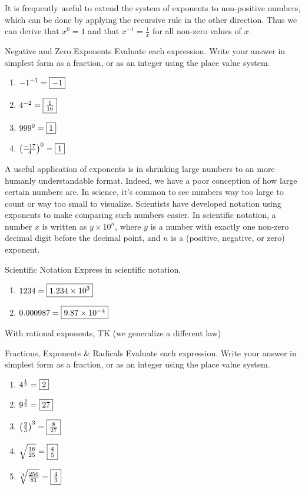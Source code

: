 \documentclass[12pt,a4paper]{report}
\begin{document}
It is frequently useful to extend the system of exponents to non-positive numbers, which can
be done by applying the recursive rule in the other direction. Thus we can derive that \(x^0
= 1\) and that \(x^{-1} = \frac{1}{x}\) for all non-zero values of \(x\).

\begin{problem}{Negative and Zero Exponents}
 Evaluate each expression. Write your answer in simplest form as a fraction, or
 as an integer using the place value system.

 \begin{enumerate}[\hspace{.5cm}a.]
  \item \({-1}^{-1}=\Ans{-1}\)
  \item \(4^{-2}=\Ans{\frac{1}{16}}\)
  \item \({999}^0=\Ans{1}\)
  \item \({\left(\frac{-17}{4}\right)}^0=\Ans{1}\)
 \end{enumerate}
\end{problem}

A useful application of exponents is in shrinking large numbers to an more humanly
understandable format. Indeed, we have a poor conception of how large certain numbers are.
In science, it's common to see numbers way too large to count or way too small to visualize.
Scientists have developed notation using exponents to make comparing such numbers easier. In
scientific notation, a number \(x\) is written as \(y\times 10^n\), where \(y\) is a number
with exactly one non-zero decimal digit before the decimal point, and \(n\) is a (positive,
negative, or zero) exponent.

\begin{problem}{Scientific Notation}
 Express in scientific notation.

 \begin{enumerate}[\hspace{.5cm}a.]
  \item \(1234=\Ans{1.234\times 10^3}\)
  \item \(0.000987= \Ans{9.87\times 10^{-4}}\)
 \end{enumerate}
\end{problem}

With rational exponents, TK (we generalize a different law)

\begin{problem}{Fractions, Exponents \& Radicals}
 Evaluate each expression. Write your answer in simplest form as a fraction, or
 as an integer using the place value system.

 \begin{enumerate}[\hspace{.5cm}a.]
  \item \(4^{\frac{1}{2}}=\Ans{2}\)
  \item \(9^{\frac{3}{2}}=\Ans{27}\)
  \item \({\left(\frac{2}{3}\right)}^3=\Ans{\frac{8}{27}}\)
  \item \(\sqrt{\frac{16}{25}}=\Ans{\frac{4}{5}}\)
  \item \(\sqrt[4]{\frac{256}{81}}=\Ans{\frac{4}{3}}\)
 \end{enumerate}
\end{problem}
\end{document}

